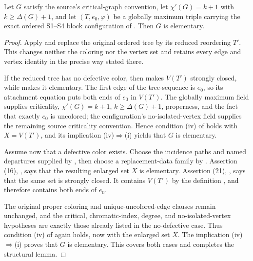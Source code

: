 \begin{lemma}
Let $G$ satisfy the source's critical-graph convention, let
$\chi'(G)=k+1$ with $k\geq\Delta(G)+1$, and let
$(T,e_0,\varphi)$ be a globally maximum triple carrying the exact ordered
S1--S4 block configuration of
.  Then $G$ is elementary.
\end{lemma}
\begin{proof}
Apply  and replace the original ordered
tree by its reduced reordering $T'$.  This changes neither the coloring nor
the vertex set and retains every edge and vertex identity in the precise
way stated there.

If the reduced tree has no defective color, then
 makes $V(T')$ strongly closed,
while  makes it elementary.  The first
edge of the tree-sequence is $e_0$, so its attachment equation puts both
ends of $e_0$ in $V(T')$.  The globally maximum field supplies criticality,
$\chi'(G)=k+1$, $k\geq\Delta(G)+1$, properness, and the fact that exactly
$e_0$ is uncolored; the configuration's no-isolated-vertex field supplies
the remaining source criticality convention.  Hence condition (iv) of
 holds with $X=V(T')$, and its implication
(iv)$\Rightarrow$(i) yields that $G$ is elementary.

Assume now that a defective color exists.  Choose the incidence paths and
named departures supplied by , then
choose a replacement-data family by
.  Assertion (16),
, says that the resulting enlarged set
$X$ is elementary.  Assertion (21),
, says that the same set is strongly
closed.  It contains $V(T')$ by the definition
, and therefore contains both ends of
$e_0$.

The original proper coloring and unique-uncolored-edge clauses remain
unchanged, and the critical, chromatic-index, degree, and no-isolated-vertex
hypotheses are exactly those already listed in the no-defective case.
Thus condition (iv) of  again holds, now with the enlarged
set $X$.  The implication (iv)$\Rightarrow$(i) proves that $G$ is
elementary.  This covers both cases and completes the structural lemma.
\end{proof}
